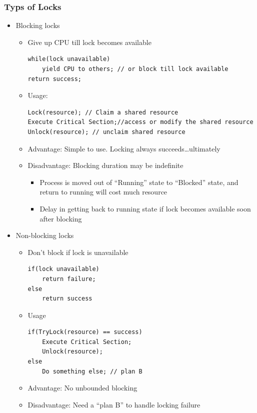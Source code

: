 \documentclass[12pt]{article}
\begin{document}
\subsubsection{Typs of Locks}
\begin{itemize}
    \item Blocking locks \begin{itemize}
        \item Give up CPU till lock becomes available \begin{lstlisting}
while(lock unavailable)
    yield CPU to others; // or block till lock available        
return success;
            \end{lstlisting}
        \item Usage: \begin{lstlisting}
Lock(resource); // Claim a shared resource
Execute Critical Section;//access or modify the shared resource
Unlock(resource); // unclaim shared resource
        \end{lstlisting}
        \item Advantage: Simple to use. Locking always succeeds…ultimately
        \item Disadvantage: Blocking duration may be indefinite \begin{itemize}
            \item Process is moved out of “Running” state to “Blocked” state, and return to running will cost much resource
            \item Delay in getting back to running state if lock becomes available soon after blocking
        \end{itemize}
    \end{itemize}
    \item Non-blocking locks \begin{itemize}
        \item Don’t block if lock is unavailable \begin{lstlisting}
if(lock unavailable)
    return failure;
else
    return success
        \end{lstlisting}
        \item Usage \begin{lstlisting}
if(TryLock(resource) == success)
    Execute Critical Section;
    Unlock(resource);
else
    Do something else; // plan B
        \end{lstlisting}
        \item Advantage: No unbounded blocking
        \item Disadvantage: Need a “plan B” to handle locking failure

\end{itemize}
\end{itemize}
\end{document}
